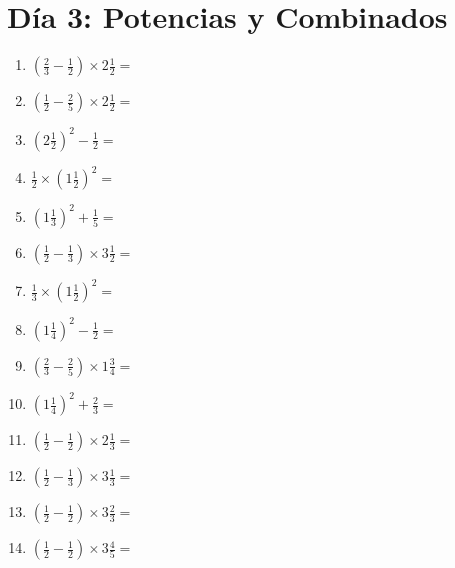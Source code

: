\documentclass[12pt]{article}
\begin{document}
\section*{Día 3: Potencias y Combinados}
\begin{enumerate}
\item \large $ \left( \frac{2}{3} - \frac{1}{2} \right) \times 2 \frac{1}{2} = $ \vspace{1.6cm}
\item \large $ \left( \frac{1}{2} - \frac{2}{5} \right) \times 2 \frac{1}{2} = $ \vspace{1.6cm}
\item \large $ \left( 2 \frac{1}{2} \right)^2 - \frac{1}{2} = $ \vspace{1.6cm}
\item \large $ \frac{1}{2} \times \left( 1 \frac{1}{2} \right)^2 = $ \vspace{1.6cm}
\item \large $ \left( 1 \frac{1}{3} \right)^2 + \frac{1}{5} = $ \vspace{1.6cm}
\item \large $ \left( \frac{1}{2} - \frac{1}{3} \right) \times 3 \frac{1}{2} = $ \vspace{1.6cm}
\item \large $ \frac{1}{3} \times \left( 1 \frac{1}{2} \right)^2 = $ \vspace{1.6cm}
\item \large $ \left( 1 \frac{1}{4} \right)^2 - \frac{1}{2} = $ \vspace{1.6cm}
\item \large $ \left( \frac{2}{3} - \frac{2}{5} \right) \times 1 \frac{3}{4} = $ \vspace{1.6cm}
\item \large $ \left( 1 \frac{1}{4} \right)^2 + \frac{2}{3} = $ \vspace{1.6cm}
\newpage
\item \large $ \left( \frac{1}{2} - \frac{1}{2} \right) \times 2 \frac{1}{3} = $ \vspace{1.6cm}
\item \large $ \left( \frac{1}{2} - \frac{1}{3} \right) \times 3 \frac{1}{3} = $ \vspace{1.6cm}
\item \large $ \left( \frac{1}{2} - \frac{1}{2} \right) \times 3 \frac{2}{3} = $ \vspace{1.6cm}
\item \large $ \left( \frac{1}{2} - \frac{1}{2} \right) \times 3 \frac{4}{5} = $ \vspace{1.6cm}

\end{enumerate}
\end{document}
